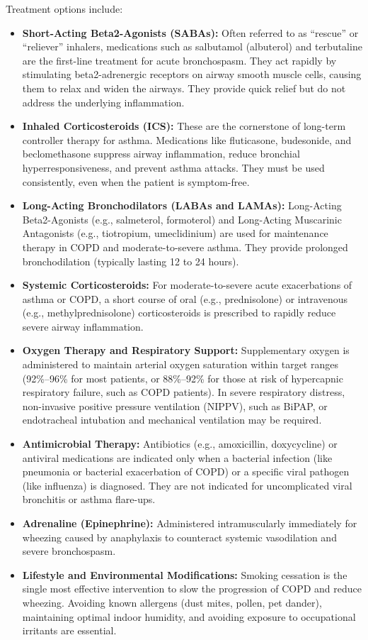 Treatment options include:
\begin{itemize}
    \item \textbf{Short-Acting Beta2-Agonists (SABAs):} Often referred to as ``rescue'' or ``reliever'' inhalers, medications such as salbutamol (albuterol) and terbutaline are the first-line treatment for acute bronchospasm. They act rapidly by stimulating beta2-adrenergic receptors on airway smooth muscle cells, causing them to relax and widen the airways. They provide quick relief but do not address the underlying inflammation.
    \item \textbf{Inhaled Corticosteroids (ICS):} These are the cornerstone of long-term controller therapy for asthma. Medications like fluticasone, budesonide, and beclomethasone suppress airway inflammation, reduce bronchial hyperresponsiveness, and prevent asthma attacks. They must be used consistently, even when the patient is symptom-free.
    \item \textbf{Long-Acting Bronchodilators (LABAs and LAMAs):} Long-Acting Beta2-Agonists (e.g., salmeterol, formoterol) and Long-Acting Muscarinic Antagonists (e.g., tiotropium, umeclidinium) are used for maintenance therapy in COPD and moderate-to-severe asthma. They provide prolonged bronchodilation (typically lasting 12 to 24 hours).
    \item \textbf{Systemic Corticosteroids:} For moderate-to-severe acute exacerbations of asthma or COPD, a short course of oral (e.g., prednisolone) or intravenous (e.g., methylprednisolone) corticosteroids is prescribed to rapidly reduce severe airway inflammation.
    \item \textbf{Oxygen Therapy and Respiratory Support:} Supplementary oxygen is administered to maintain arterial oxygen saturation within target ranges (92\%--96\% for most patients, or 88\%--92\% for those at risk of hypercapnic respiratory failure, such as COPD patients). In severe respiratory distress, non-invasive positive pressure ventilation (NIPPV), such as BiPAP, or endotracheal intubation and mechanical ventilation may be required.
    \item \textbf{Antimicrobial Therapy:} Antibiotics (e.g., amoxicillin, doxycycline) or antiviral medications are indicated only when a bacterial infection (like pneumonia or bacterial exacerbation of COPD) or a specific viral pathogen (like influenza) is diagnosed. They are not indicated for uncomplicated viral bronchitis or asthma flare-ups.
    \item \textbf{Adrenaline (Epinephrine):} Administered intramuscularly immediately for wheezing caused by anaphylaxis to counteract systemic vasodilation and severe bronchospasm.
    \item \textbf{Lifestyle and Environmental Modifications:} Smoking cessation is the single most effective intervention to slow the progression of COPD and reduce wheezing. Avoiding known allergens (dust mites, pollen, pet dander), maintaining optimal indoor humidity, and avoiding exposure to occupational irritants are essential.
\end{itemize}

